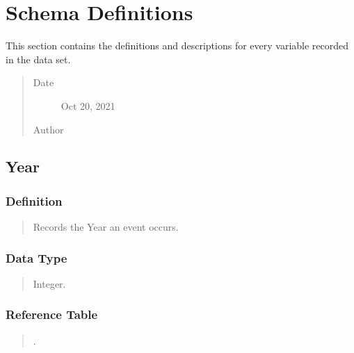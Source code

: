 \documentclass[letterpaper,10pt,english]{sphinxmanual}
\begin{document}
\section{Schema Definitions}
\label{\detokenize{database_schema:schema-definitions}}
\begin{sphinxShadowBox}

\sphinxAtStartPar
This section contains the definitions and descriptions for every variable recorded in the data set.
\begin{quote}\begin{description}
\item[{Date}] \leavevmode
\sphinxAtStartPar
Oct 20, 2021

\item[{Author}] \leavevmode
\sphinxAtStartPar
{}

\end{description}\end{quote}
\end{sphinxShadowBox}


\subsection{Year}
\label{\detokenize{database_schema:year}}

\subsubsection{Definition}
\label{\detokenize{database_schema:definition}}\begin{quote}

\sphinxAtStartPar
Records the Year an event occurs.
\end{quote}


\subsubsection{Data Type}
\label{\detokenize{database_schema:data-type}}\begin{quote}

\sphinxAtStartPar
Integer.
\end{quote}


\subsubsection{Reference Table}
\label{\detokenize{database_schema:reference-table}}\begin{quote}

\sphinxAtStartPar
{\hyperref[\detokenize{database_schema:overview-table}]{}}.
\end{quote}
\end{document}
